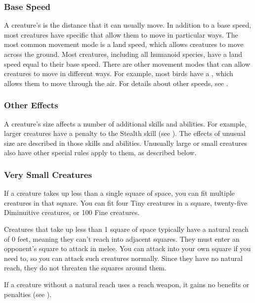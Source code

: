         \subsubsection{Base Speed}\label{Base Speed}
            A creature's  is the distance that it can usually move.
            In addition to a base speed, most creatures have specific  that allow them to move in particular ways.
            The most common movement mode is a land speed, which allows creatures to move across the ground.
            Most creatures, including all humanoid species, have a land speed equal to their base speed.
            There are other movement modes that can allow creatures to move in different ways.
            For example, most birds have a , which allows them to move through the air.
            For details about other speeds, see .

        \subsubsection{Other Effects}
            A creature's size affects a number of additional skills and abilities.
            For example, larger creatures have a penalty to the Stealth skill (see ).
            The effects of unusual size are described in those skills and abilities.
            Unusually large or small creatures also have other special rules apply to them, as described below.

        \subsubsection{Very Small Creatures}
             If a creature takes up less than a single square of space, you can fit multiple creatures in that square. You can fit four Tiny creatures in a square, twenty-five Diminuitive creatures, or 100 Fine creatures.

             Creatures that take up less than 1 square of space typically have a natural reach of 0 feet, meaning they can't reach into adjacent squares. They must enter an opponent's square to attack in melee. You can attack into your own square if you need to, so you can attack such creatures normally. Since they have no natural reach, they do not threaten the squares around them.

            If a creature without a natural reach uses a reach weapon, it gains no benefits or penalties (see ).

